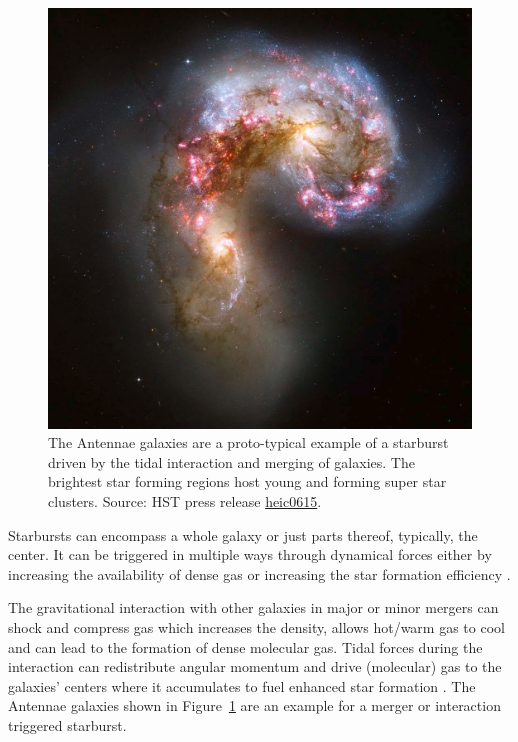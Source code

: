 \begin{figure}
	\centering
	\includegraphics[width=\linewidth]{images/chapters/introduction/sf/Antennae_HST.pdf}
	\caption[Starburst in the Antennae galaxies]{The Antennae galaxies are a proto-typical example of a starburst driven by the tidal interaction and merging of galaxies. The brightest star forming regions host young and forming super star clusters. Source: HST press release \href{https://www.spacetelescope.org/news/heic0615/}{heic0615}.}
	\label{introduction: figure: star formation: Antennae starburst}
\end{figure}

Starbursts can encompass a whole galaxy or just parts thereof, typically, the center. It can be triggered in multiple ways through dynamical forces either by increasing the availability of dense gas or increasing the star formation efficiency \citep[e.g.][]{1991ApJ...370L..65B,1992ARA&A..30..705B}.

The gravitational interaction with other galaxies in major or minor mergers can shock and compress gas which increases the density, allows hot/warm gas to cool and can lead to the formation of dense molecular gas. Tidal forces during the interaction can redistribute angular momentum and drive (molecular) gas to the galaxies' centers where it accumulates to fuel enhanced star formation \citep[e.g.][]{1996ApJ...464..641M}. The Antennae galaxies shown in Figure~\ref{introduction: figure: star formation: Antennae starburst} are an example for a merger or interaction triggered starburst.

